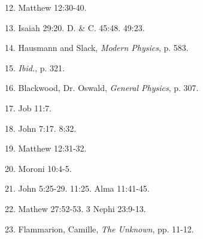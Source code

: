 12. Matthew 12:30-40.

13. Isaiah 29:20. D. \& C. 45:48. 49:23.

14. Hausmann and Slack, \textit{Modern Physics}, p. 583.

15. \textit{Ibid.}, p. 321.

16. Blackwood, Dr. Oswald, \textit{General Physics}, p. 307.

17. Job 11:7.

18. John 7:17. 8:32.

19. Matthew 12:31-32.

20. Moroni 10:4-5.

21. John 5:25-29. 11:25. Alma 11:41-45.

22. Mathew 27:52-53. 3 Nephi 23:9-13.

23. Flammarion, Camille, \textit{The Unknown}, pp. 11-12.


